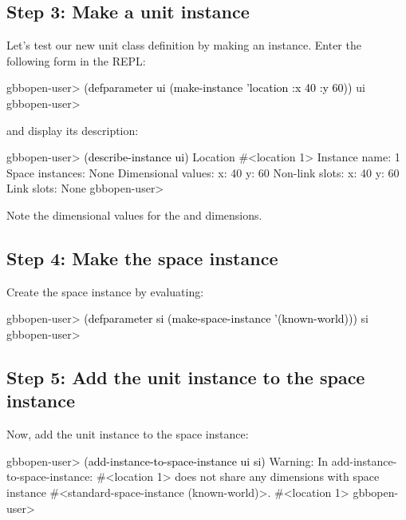 \documentclass[10pt,twoside,english,pdftex]{article}
\begin{document}
\subsection*{Step 3: Make  a  unit instance}

%
%
Let's test our new  unit class definition by making an
instance.  Enter the following form in the REPL:
%
\W\supp
\begin{example}
\textcolor{darkergray}{%
  gbbopen-user> \textcolor{black}{(defparameter ui (make-instance 'location :x 40 :y 60))}
  ui
  gbbopen-user>}
\end{example}
%
%
and display its description:
%
\W\supp\notpretop
\begin{example}
\textcolor{darkergray}{%
  gbbopen-user> \textcolor{black}{(describe-instance ui)}
  Location #<location 1>
    Instance name: 1
    Space instances: None
    Dimensional values:
      x:  40
      y:  60
    Non-link slots:
      x:  40
      y:  60
    Link slots: None
  gbbopen-user>}
\end{example}
%
Note the dimensional values for the  and  dimensions.

\subsection*{Step 4: Make  the  space instance}

%
Create the  space instance by evaluating:
%
\W\supp
\begin{example}
\textcolor{darkergray}{%
  gbbopen-user> \textcolor{black}{(defparameter si (make-space-instance '(known-world)))}
  si
  gbbopen-user>}
\end{example}

\subsection*{Step 5: Add the unit instance to the space instance}

%
Now, add the  unit instance to the space instance:
%
\W\supp
\begin{example}
\textcolor{darkergray}{%
  gbbopen-user> \textcolor{black}{(add-instance-to-space-instance ui si)}
  Warning: In add-instance-to-space-instance: #<location 1>
           does not share any dimensions with space instance 
           #<standard-space-instance (known-world)>.
  #<location 1>
  gbbopen-user>}
\end{example}
\end{document}
